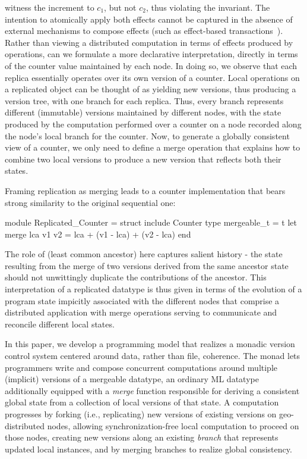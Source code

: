 witness the increment to $c_1$, but not $c_2$, thus violating the
invariant. The intention to atomically apply both effects cannot be
captured in the absence of external mechanisms to compose effects
(such as effect-based transactions~\cite{pldi15}).  Rather than
viewing a distributed computation in terms of  effects produced
by operations, can we formulate a more declarative interpretation,
directly in terms of the counter value maintained by each node.  In
doing so, we observe that each replica essentially operates over its
own version of a counter.  Local operations on a replicated object can
be thought of as yielding new versions, thus producing a version tree,
with one branch for each replica.  Thus, every branch represents
different (immutable) versions maintained by different nodes, with the
state produced by the computation performed over a counter on a node
recorded along the node's local branch for the counter.  Now, to
generate a globally consistent view of a counter, we only need to
define a merge operation that explains how to combine two local
versions to produce a new version that reflects both their states.

Framing replication as merging leads to a counter implementation that
bears strong similarity to the original sequential one:
  \begin{ocaml}
    module Replicated_Counter = struct
      include Counter
      type mergeable_t = t 
      let merge lca v1 v2 =
         lca + (v1 - lca) + (v2 - lca)
    end
  \end{ocaml}

The role of  (least common ancestor) here captures salient
history - the state resulting from the merge of two versions derived
from the same ancestor state should not unwittingly duplicate the
contributions of the ancestor.  This interpretation of a replicated
datatype is thus given in terms of the evolution of a program state
impicitly associated with the different nodes that comprise a
distributed application with merge operations serving to communicate
and reconcile different local states.

In this paper, we develop a programming model that realizes a monadic
version control system centered around data, rather than file,
coherence.  The \name monad lets programmers write and compose
concurrent computations around multiple (implicit) versions of a
mergeable datatype, an ordinary ML datatype additionally equipped with
a \emph{merge} function responsible for deriving a consistent global
state from a collection of local versions of that state.  A
computation progresses by forking (i.e., replicating) new versions of
existing versions on geo-distributed nodes, allowing
synchronization-free local computation to proceed on those nodes,
creating new versions along an existing \emph{branch} that represents
updated local instances, and by merging branches to realize global
consistency.

